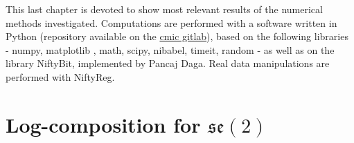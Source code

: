 This last chapter is devoted to show most relevant results of the numerical methods investigated.
Computations are performed with a software written in Python (repository available on the \href{https://cmiclab.cs.ucl.ac.uk}{cmic gitlab}), based on 
the following libraries - numpy, matplotlib \cite{hunter2007}, math, scipy, nibabel, timeit, random - as well as on the library NiftyBit, implemented by Pancaj Daga. Real data manipulations are performed with NiftyReg.

\section{Log-composition for $\mathfrak{se}(2)$}

